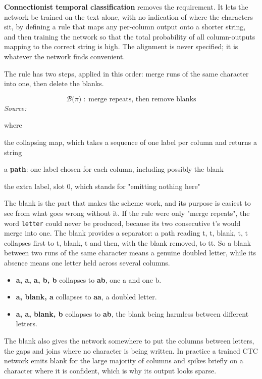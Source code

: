 \textbf{Connectionist temporal classification} \cite{graves2006} removes the requirement. It lets the network be trained on the text alone, with no indication of where the characters sit, by defining a rule that maps any per-column output onto a shorter string, and then training the network so that the total probability of all column-outputs mapping to the correct string is high. The alignment is never specified; it is whatever the network finds convenient.


The rule has two steps, applied in this order: merge runs of the same character into one, then delete the blanks.


\begin{equation}
\mathcal{B}\big(\pi\big) \;:\; \text{merge repeats, then remove blanks}
\end{equation}
\noindent\emph{Source: }\cite{graves2006}


\noindent where
\begin{description}[leftmargin=2.4em,style=nextline,font=\normalfont\ttfamily]\setlength\itemsep{1pt}
  \item[{$\mathcal{B}$}] \normalfont the collapsing map, which takes a sequence of one label per column and returns a string
  \item[{$\pi$}] \normalfont a \textbf{path}: one label chosen for each column, including possibly the blank
  \item[{$\text{blank}$}] \normalfont the extra label, slot 0, which stands for "emitting nothing here"
\end{description}

The blank is the part that makes the scheme work, and its purpose is easiest to see from what goes wrong without it. If the rule were only "merge repeats", the word \texttt{letter} could never be produced, because its two consecutive t's would merge into one. The blank provides a separator: a path reading t, t, blank, t, t collapses first to t, blank, t and then, with the blank removed, to tt. So a blank between two runs of the same character means a genuine doubled letter, while its absence means one letter held across several columns.


\begin{itemize}\setlength\itemsep{0pt}
  \item \textbf{a, a, a, b, b} collapses to \textbf{ab}, one a and one b.
  \item \textbf{a, blank, a} collapses to \textbf{aa}, a doubled letter.
  \item \textbf{a, a, blank, b} collapses to \textbf{ab}, the blank being harmless between different letters.
\end{itemize}
The blank also gives the network somewhere to put the columns between letters, the gaps and joins where no character is being written. In practice a trained CTC network emits blank for the large majority of columns and spikes briefly on a character where it is confident, which is why its output looks sparse.


